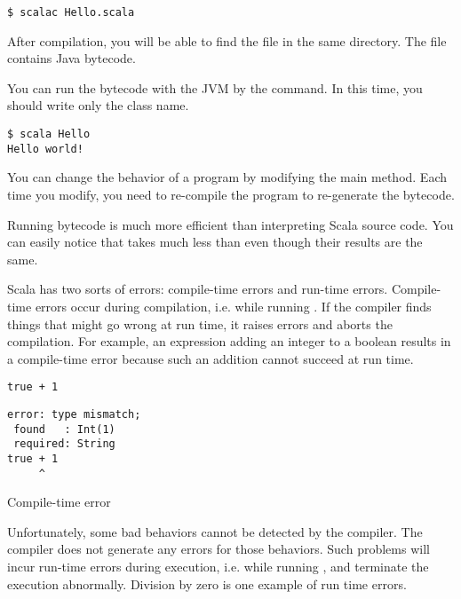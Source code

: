\begin{verbatim}
$ scalac Hello.scala
\end{verbatim}

After compilation, you will be able to find the  file
in the same directory. The file contains Java bytecode.

You can run the bytecode with the JVM by the  command. In this time,
you should write only the class name.

\begin{verbatim}
$ scala Hello
Hello world!
\end{verbatim}

You can change the behavior of a program by modifying the main method.
Each time you modify, you need to re-compile the program to re-generate the
bytecode.

Running bytecode is much more efficient than interpreting Scala source code.
You can easily notice that  takes much less than  even though their results are the same.

Scala has two sorts of errors: compile-time errors and run-time errors.
Compile-time errors occur during compilation, i.e. while running .
If the compiler finds things that
might go wrong at run time, it raises errors and aborts the compilation. For
example, an expression adding an integer to a boolean results in a compile-time
error because such an addition cannot succeed at run time.

\begin{verbatim}
true + 1
\end{verbatim}
\vspace{-1em}
\begin{mdframed}[hidealllines=true,backgroundcolor=red!10,innerleftmargin=3pt,innerrightmargin=3pt,leftmargin=-3pt,rightmargin=-3pt]
\begin{verbatim}
error: type mismatch;
 found   : Int(1)
 required: String
true + 1
     ^
\end{verbatim}
\vspace{-2em}
\begin{flushright}
\scriptsize\textsf{Compile-time error}
\end{flushright}
\end{mdframed}

Unfortunately, some bad behaviors cannot be detected by the compiler.
The compiler does not generate any errors for those behaviors.
Such problems will incur run-time errors during execution, i.e. while running
,
and terminate the execution abnormally. Division by zero is one
example of run time errors.

